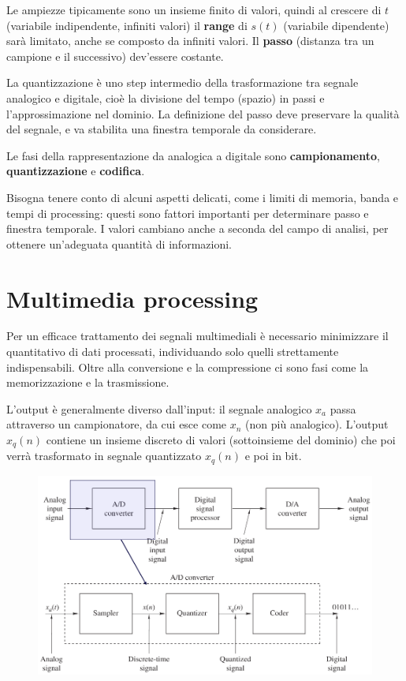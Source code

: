 Le ampiezze tipicamente sono un insieme finito di valori, quindi al crescere di $t$ (variabile indipendente, infiniti valori) il \textbf{range} di $s(t)$ (variabile dipendente) sarà limitato, anche se composto da infiniti valori. Il \textbf{passo} (distanza tra un campione e il successivo) dev'essere costante.

La quantizzazione è uno step intermedio della trasformazione tra segnale analogico e digitale, cioè la divisione del tempo (spazio) in passi e l'approssimazione nel dominio. La definizione del passo deve preservare la qualità del segnale, e va stabilita una finestra temporale da considerare.

Le fasi della rappresentazione da analogica a digitale sono \textbf{campionamento}, \textbf{quantizzazione} e \textbf{codifica}.

Bisogna tenere conto di alcuni aspetti delicati, come i limiti di memoria, banda e tempi di processing: questi sono fattori importanti per determinare passo e finestra temporale. I valori cambiano anche a seconda del campo di analisi, per ottenere un'adeguata quantità di informazioni.

\section{Multimedia processing}
Per un efficace trattamento dei segnali multimediali è necessario minimizzare il quantitativo di dati processati, individuando solo quelli strettamente indispensabili. Oltre alla conversione e la compressione ci sono fasi come la memorizzazione e la trasmissione.

L'output è generalmente diverso dall'input: il segnale analogico $x_a$ passa attraverso un campionatore, da cui esce come $x_n$ (non più analogico). L'output $x_q(n)$ contiene un insieme discreto di valori (sottoinsieme del dominio) che poi verrà trasformato in segnale quantizzato $x_q(n)$ e poi in bit.

\begin{figure}[h]
	\centering
	\includegraphics[scale=0.45]{Lezioni/Immagini/conversioneAD}
\end{figure}

